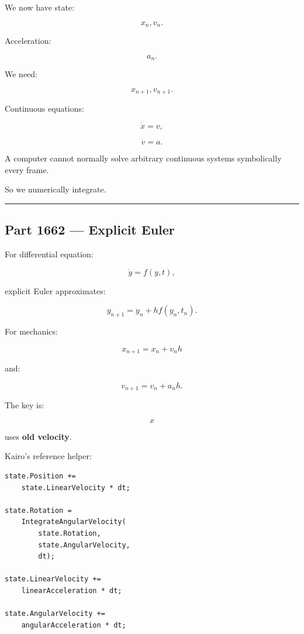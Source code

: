 \hypertarget{06-engine-ii-ch037-discretizing-newtons-equations}{}

We now have state:

\[
x_n,
v_n.
\]

Acceleration:

\[
a_n.
\]

We need:

\[
x_{n+1},
v_{n+1}.
\]

Continuous equations:

\[
\dot x=v,
\]

\[
\dot v=a.
\]

A computer cannot normally solve arbitrary continuous systems symbolically every frame.

So we numerically integrate.

\begin{center}\rule{0.5\linewidth}{0.5pt}\end{center}

\subsection{Part 1662 --- Explicit Euler}\label{06-engine-ii-ch037-part-1662-explicit-euler}

\hypertarget{06-engine-ii-ch037-part-1662-explicit-euler}{}

For differential equation:

\[
\dot y=f(y,t),
\]

explicit Euler approximates:

\[
\boxed{
y_{n+1}
=
y_n+
h f(y_n,t_n).
}
\]

For mechanics:

\[
x_{n+1}
=
x_n+
v_nh
\]

and:

\[
v_{n+1}
=
v_n+
a_nh.
\]

The key is:

\[
x
\]

uses \textbf{old velocity}.

Kairo's reference helper:

\begin{verbatim}
state.Position +=
    state.LinearVelocity * dt;

state.Rotation =
    IntegrateAngularVelocity(
        state.Rotation,
        state.AngularVelocity,
        dt);

state.LinearVelocity +=
    linearAcceleration * dt;

state.AngularVelocity +=
    angularAcceleration * dt;
\end{verbatim}

